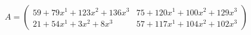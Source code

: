 \documentclass[preview]{standalone}
\begin{document}
\begin{align*}
A = \begin{pmatrix}59 + 79x^{1} + 123x^{2} + 136x^{3} & 75 + 120x^{1} + 100x^{2} + 129x^{3} \\ 21 + 54x^{1} + 3x^{2} + 8x^{3} & 57 + 117x^{1} + 104x^{2} + 102x^{3}\end{pmatrix}
\end{align*}
\end{document}

